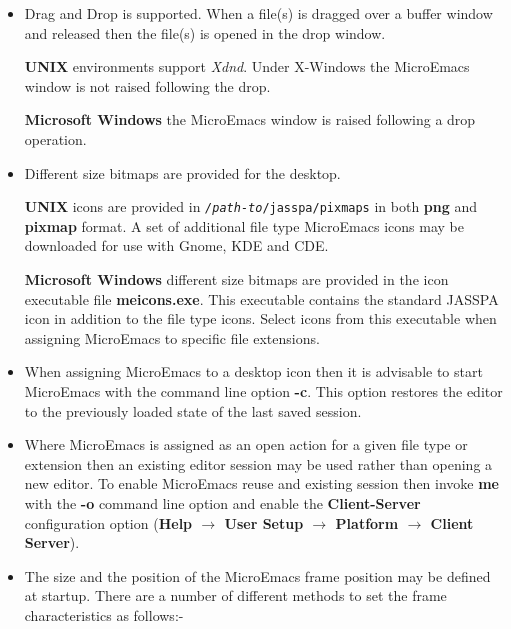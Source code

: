 \documentclass[11pt,a4paper,pdftex]{article}
\begin{document}
  \begin{itemize}

    \item Drag and Drop is supported. When a file(s) is dragged over a buffer
    window and released then the file(s) is opened in the drop window.

    \textbf{UNIX} environments support \textit{Xdnd}. Under X-Windows the
    MicroEmacs window is not raised following the drop.

    \textbf{Microsoft Windows} the MicroEmacs window is raised following
    a drop operation.

    \item Different size bitmaps are provided for the desktop.

    \textbf{UNIX} icons are provided in
    \texttt{\textit{/path-to}/jasspa/pixmaps} in both \textbf{png} and
    \textbf{pixmap} format. A set of additional file type MicroEmacs icons may
    be downloaded for use with Gnome, KDE and CDE.

    \textbf{Microsoft Windows} different size bitmaps are provided in the icon
    executable file \textbf{meicons.exe}. This executable contains the
    standard JASSPA icon in addition to the file type icons. Select icons from
    this executable when assigning MicroEmacs to specific file extensions.

    \item When assigning MicroEmacs to a desktop icon then it is advisable to
    start MicroEmacs with the command line option \textbf{-c}. This option
    restores the editor to the previously loaded state of the last saved
    session.

    \item Where MicroEmacs is assigned as an open action for a given file type
    or extension then an existing editor session may be used rather than
    opening a new editor. To enable MicroEmacs reuse and existing session then
    invoke \textbf{me} with the \textbf{-o} command line option and enable the
    \textbf{Client-Server} configuration option (\textbf{Help $\rightarrow$
    User Setup $\rightarrow$ Platform $\rightarrow$ Client Server}).

    \item The size and the position of the MicroEmacs frame position may be
    defined at startup. There are a number of different methods to set the
    frame characteristics as follows:-

    \begin{itemize}


\end{itemize}
\end{itemize}
\end{document}
